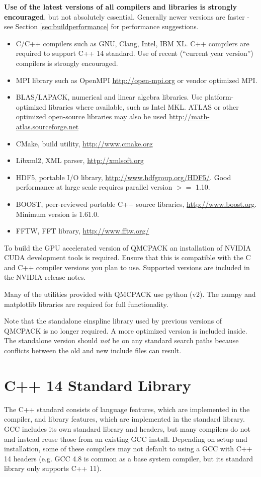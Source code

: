 \textbf{Use of the latest versions of all compilers and libraries is
strongly encouraged}, but not absolutely essential. Generally newer versions are faster - see
Section \ref{sec:buildperformance} for performance suggestions.

\begin{itemize}
\item C/C++ compilers such as GNU, Clang, Intel, IBM XL. C++ compilers
  are required to support C++ 14 standard. Use of recent (``current
  year version'') compilers is strongly encouraged.
\item MPI library such as OpenMPI \url{http://open-mpi.org} or vendor
  optimized MPI.
\item BLAS/LAPACK, numerical and linear algebra libraries. Use
  platform-optimized libraries where available, such as Intel MKL.
  ATLAS or other optimized open-source libraries may also be used
  \url{http://math-atlas.sourceforge.net}
\item CMake, build utility, \url{http://www.cmake.org}
\item Libxml2, XML parser, \url{http://xmlsoft.org}
\item HDF5, portable I/O library, \url{http://www.hdfgroup.org/HDF5/}. Good performance at large scale requires parallel version $>=$ 1.10.
\item BOOST, peer-reviewed portable C++ source libraries, \url{http://www.boost.org}.   Minimum version is 1.61.0.
\item FFTW, FFT library, \url{http://www.fftw.org/}
\end{itemize}

To build the GPU accelerated version of QMCPACK an installation of
NVIDIA CUDA development tools is required. Ensure that this is
compatible with the C and C++ compiler versions you plan to
use. Supported versions are included in the NVIDIA release notes.

Many of the utilities provided with QMCPACK use python (v2). The numpy
and matplotlib libraries are required for full functionality.

Note that the standalone einspline library used by previous versions of QMCPACK
is no longer required. A more optimized version is included
inside. The standalone version should \emph{not} be on any standard
search paths because conflicts between the old and new include files
can result.

\section{C++ 14 Standard Library}
The C++ standard consists of language features, which are implemented in the compiler, and library features, which are implemented in the standard library.
GCC includes its own standard library and headers, but many compilers do not and instead reuse those from an existing GCC install.
Depending on setup and installation, some of these compilers may not default to using a GCC with C++ 14 headers (e.g. GCC 4.8 is common as a base system compiler, but its standard library only supports C++ 11).

